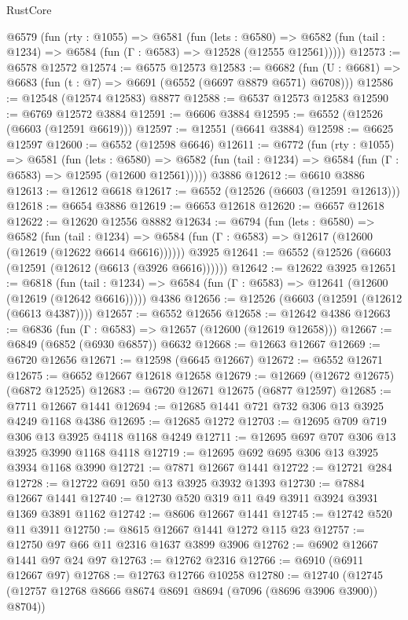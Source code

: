 \begin{lexlean}{RustCore}
\begin{coremodule}
  @6579
    (fun (rty : @1055) =>
    @6581
      (fun (lets : @6580) =>
      @6582 (fun (tail : @1234) => @6584 (fun (Γ : @6583) => @12528 (@12555 @12561)))))
@12573 := @6578 @12572
@12574 := @6575 @12573
@12583 := @6682 (fun (U : @6681) => @6683 (fun (t : @7) => @6691 (@6552 (@6697 @8879 @6571) @6708)))
@12586 := @12548 (@12574 @12583) @8877
@12588 := @6537 @12573 @12583
@12590 := @6769 @12572 @3884
@12591 := @6606 @3884
@12595 := @6552 (@12526 (@6603 (@12591 @6619)))
@12597 := @12551 (@6641 @3884)
@12598 := @6625 @12597
@12600 := @6552 (@12598 @6646)
@12611 := @6772
    (fun (rty : @1055) =>
    @6581
      (fun (lets : @6580) =>
      @6582 (fun (tail : @1234) => @6584 (fun (Γ : @6583) => @12595 (@12600 @12561)))))
    @3886
@12612 := @6610 @3886
@12613 := @12612 @6618
@12617 := @6552 (@12526 (@6603 (@12591 @12613)))
@12618 := @6654 @3886
@12619 := @6653 @12618
@12620 := @6657 @12618
@12622 := @12620 @12556 @8882
@12634 := @6794
    (fun (lets : @6580) =>
    @6582
      (fun (tail : @1234) =>
      @6584 (fun (Γ : @6583) => @12617 (@12600 (@12619 (@12622 @6614 @6616))))))
    @3925
@12641 := @6552 (@12526 (@6603 (@12591 (@12612 (@6613 (@3926 @6616))))))
@12642 := @12622 @3925
@12651 := @6818
    (fun (tail : @1234) => @6584 (fun (Γ : @6583) => @12641 (@12600 (@12619 (@12642 @6616)))))
    @4386
@12656 := @12526 (@6603 (@12591 (@12612 (@6613 @4387))))
@12657 := @6552 @12656
@12658 := @12642 @4386
@12663 := @6836 (fun (Γ : @6583) => @12657 (@12600 (@12619 @12658)))
@12667 := @6849 (@6852 (@6930 @6857)) @6632
@12668 := @12663 @12667
@12669 := @6720 @12656
@12671 := @12598 (@6645 @12667)
@12672 := @6552 @12671
@12675 := @6652 @12667 @12618 @12658
@12679 := @12669 (@12672 @12675) (@6872 @12525)
@12683 := @6720 @12671 @12675 (@6877 @12597)
@12685 := @7711 @12667 @1441
@12694 := @12685 @1441 @721 @732 @306 @13 @3925 @4249 @1168 @4386
@12695 := @12685 @1272
@12703 := @12695 @709 @719 @306 @13 @3925 @4118 @1168 @4249
@12711 := @12695 @697 @707 @306 @13 @3925 @3990 @1168 @4118
@12719 := @12695 @692 @695 @306 @13 @3925 @3934 @1168 @3990
@12721 := @7871 @12667 @1441
@12722 := @12721 @284
@12728 := @12722 @691 @50 @13 @3925 @3932 @1393
@12730 := @7884 @12667 @1441
@12740 := @12730 @520 @319 @11 @49 @3911 @3924 @3931 @1369 @3891 @1162
@12742 := @8606 @12667 @1441
@12745 := @12742 @520 @11 @3911
@12750 := @8615 @12667 @1441 @1272 @115 @23
@12757 := @12750 @97 @66 @11 @2316 @1637 @3899 @3906
@12762 := @6902 @12667 @1441 @97 @24 @97
@12763 := @12762 @2316
@12766 := @6910 (@6911 @12667 @97)
@12768 := @12763 @12766 @10258
@12780 := @12740 (@12745 (@12757 @12768 @8666 @8674 @8691 @8694 (@7096 (@8696 @3906 @3900)) @8704))

\end{coremodule}
\end{lexlean}
